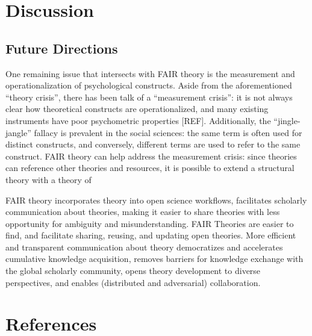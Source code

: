 \documentclass[
  man,floatsintext]{apa6}
\begin{document}
\section{Discussion}\label{discussion}

\subsection{Future Directions}\label{future-directions}

One remaining issue that intersects with FAIR theory is the measurement and operationalization of psychological constructs.
Aside from the aforementioned ``theory crisis'', there has been talk of a ``measurement crisis'':
it is not always clear how theoretical constructs are operationalized, and many existing instruments have poor psychometric properties {[}REF{]}.
Additionally, the ``jingle-jangle'' fallacy is prevalent in the social sciences:
the same term is often used for distinct constructs, and conversely, different terms are used to refer to the same construct.
FAIR theory can help address the measurement crisis:
since theories can reference other theories and resources, it is possible to extend a structural theory with a theory of

FAIR theory incorporates theory into open science workflows,
facilitates scholarly communication about theories,
making it easier to share theories with less opportunity for ambiguity and misunderstanding.
FAIR Theories are easier to find, and facilitate sharing, reusing, and updating open theories.
More efficient and transparent communication about theory democratizes and accelerates cumulative knowledge acquisition,
removes barriers for knowledge exchange with the global scholarly community,
opens theory development to diverse perspectives, and enables (distributed and adversarial) collaboration.

\newpage

\section{References}\label{references}
\end{document}
